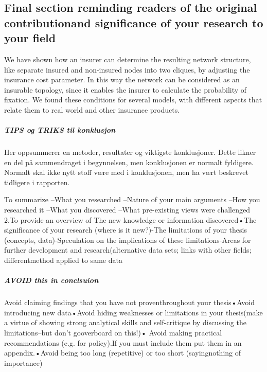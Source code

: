 \subsection{Final section reminding readers of the original contributionand significance of your research to your field}
We have shown how an insurer can determine the resulting network structure, like separate insured and non-insured nodes into two cliques, by adjusting the insurance cost parameter. In this way the network can be considered as an insurable topology, since it enables the insurer to calculate the probability of fixation. 
We found these conditions for several models, with different aspects that relate them to real world and other insurance products.

\subparagraph{TIPS og TRIKS til konklusjon}
Her oppsummerer en metoder, resultater og viktigste konklusjoner. Dette likner en del på 
sammendraget i begynnelsen, men konklusjonen er normalt fyldigere. Normalt skal ikke nytt stoff 
være med i konklusjonen, men ha vært beskrevet tidligere i rapporten. 

To summarize
 –What you researched –Nature of your main arguments –How you researched it –What you discovered –What pre-existing views were challenged
2.To provide an overview of 
The new knowledge or information discovered•The significance of your research (where is it new?)-The limitations of your thesis (concepts, data)-Speculation on the implications of these limitations-Areas for further development and research(alternative data sets; links with other fields; differentmethod applied to same data
\subparagraph{AVOID this in conclsuion}
Avoid claiming findings that you have not proventhroughout your thesis•Avoid introducing new data•Avoid hiding weaknesses or limitations in your thesis(make a virtue of showing strong analytical skills and self-critique by discussing the limitations--but don’t gooverboard on this!)• Avoid making practical recommendations (e.g. for policy).If you must include them put them in an appendix.•Avoid being too long (repetitive) or too short (sayingnothing of importance)
